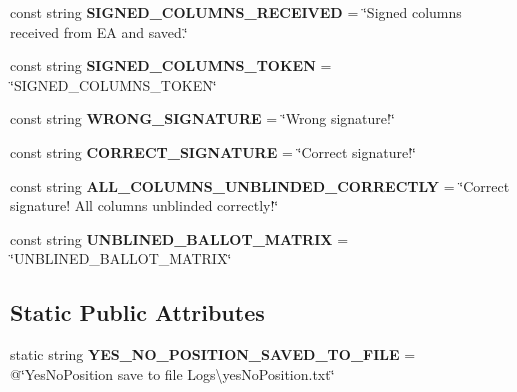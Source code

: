 \begin{DoxyCompactItemize}
\item 
\hypertarget{class_proxy_1_1_constants_a2843c70e60a937dd80bbf81ff85d12fb}{}const string {\bfseries S\+I\+G\+N\+E\+D\+\_\+\+C\+O\+L\+U\+M\+N\+S\+\_\+\+R\+E\+C\+E\+I\+V\+E\+D} = \char`\"{}Signed columns received from E\+A and saved.\char`\"{}\label{class_proxy_1_1_constants_a2843c70e60a937dd80bbf81ff85d12fb}

\item 
\hypertarget{class_proxy_1_1_constants_a8804c8fd9271c99c9fb459a9de86edcc}{}const string {\bfseries S\+I\+G\+N\+E\+D\+\_\+\+C\+O\+L\+U\+M\+N\+S\+\_\+\+T\+O\+K\+E\+N} = \char`\"{}S\+I\+G\+N\+E\+D\+\_\+\+C\+O\+L\+U\+M\+N\+S\+\_\+\+T\+O\+K\+E\+N\char`\"{}\label{class_proxy_1_1_constants_a8804c8fd9271c99c9fb459a9de86edcc}

\item 
\hypertarget{class_proxy_1_1_constants_aaaea62d89e33973394b28102b573c4af}{}const string {\bfseries W\+R\+O\+N\+G\+\_\+\+S\+I\+G\+N\+A\+T\+U\+R\+E} = \char`\"{}Wrong signature!\char`\"{}\label{class_proxy_1_1_constants_aaaea62d89e33973394b28102b573c4af}

\item 
\hypertarget{class_proxy_1_1_constants_aa469e8751494b3a09a416a2b5b2d9537}{}const string {\bfseries C\+O\+R\+R\+E\+C\+T\+\_\+\+S\+I\+G\+N\+A\+T\+U\+R\+E} = \char`\"{}Correct signature!\char`\"{}\label{class_proxy_1_1_constants_aa469e8751494b3a09a416a2b5b2d9537}

\item 
\hypertarget{class_proxy_1_1_constants_addcccabd0aa03d097186ddb479470f38}{}const string {\bfseries A\+L\+L\+\_\+\+C\+O\+L\+U\+M\+N\+S\+\_\+\+U\+N\+B\+L\+I\+N\+D\+E\+D\+\_\+\+C\+O\+R\+R\+E\+C\+T\+L\+Y} = \char`\"{}Correct signature! All columns unblinded correctly!\char`\"{}\label{class_proxy_1_1_constants_addcccabd0aa03d097186ddb479470f38}

\item 
\hypertarget{class_proxy_1_1_constants_a944ce98bee34f528c3186cb8cad97b5a}{}const string {\bfseries U\+N\+B\+L\+I\+N\+E\+D\+\_\+\+B\+A\+L\+L\+O\+T\+\_\+\+M\+A\+T\+R\+I\+X} = \char`\"{}U\+N\+B\+L\+I\+N\+E\+D\+\_\+\+B\+A\+L\+L\+O\+T\+\_\+\+M\+A\+T\+R\+I\+X\char`\"{}\label{class_proxy_1_1_constants_a944ce98bee34f528c3186cb8cad97b5a}

\end{DoxyCompactItemize}
\subsection*{Static Public Attributes}
\begin{DoxyCompactItemize}
\item 
\hypertarget{class_proxy_1_1_constants_a05f81b1c7775144e57b5addf10617365}{}static string {\bfseries Y\+E\+S\+\_\+\+N\+O\+\_\+\+P\+O\+S\+I\+T\+I\+O\+N\+\_\+\+S\+A\+V\+E\+D\+\_\+\+T\+O\+\_\+\+F\+I\+L\+E} = @\char`\"{}Yes\+No\+Position save to file Logs\textbackslash{}yes\+No\+Position.\+txt\char`\"{}\label{class_proxy_1_1_constants_a05f81b1c7775144e57b5addf10617365}

\end{DoxyCompactItemize}


